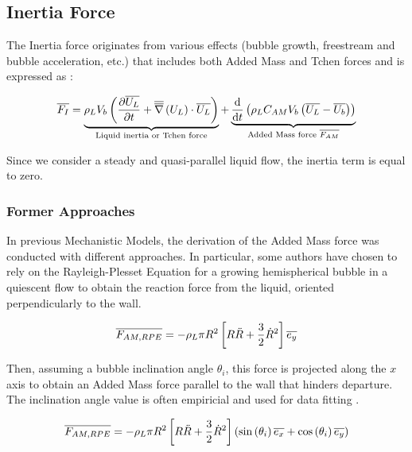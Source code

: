 \subsection{Inertia Force}
\label{subsec:AM}

The Inertia force originates from various effects (bubble growth, freestream and bubble acceleration, etc.) that includes both Added Mass and Tchen forces and is expressed as \cite{magnaudet_motion_2000}:

\begin{equation}
\overline{F_{I}} = \underbrace{ \rho_{L}V_{b}\left( \frac{\partial{\overline{U_{L}}}}{\partial t}+\overline{\overline{\nabla}}\left({U_{L}}\right)\cdot \overline{U_{L}} \right) }_{\text{Liquid inertia or Tchen force}} + \underbrace{ \frac{\mathrm{d}}{\mathrm{d}t}\left( \rho_{L}C_{AM}V_{b}\left( \overline{U_{L}}-\overline{U_{b}} \right) \right) }_{\text{Added Mass force } \overline{F_{AM}}}
\label{eq:F_inertia}
\end{equation}

Since we consider a steady and quasi-parallel liquid flow, the inertia term is equal to zero.



\subsubsection{Former Approaches}
\label{subsubsec:former_AM}

In previous Mechanistic Models, the derivation of the Added Mass force was conducted with different approaches. In particular, some authors have chosen to rely on the Rayleigh-Plesset Equation for a growing hemispherical bubble in a quiescent flow to obtain the reaction force from the liquid, oriented perpendicularly to the wall.

\begin{equation}
\overline{F_{AM,RPE}}=- \rho_{L}\pi R^{2}\left[ R\ddot{R}+\frac{3}{2}\dot{R}^{2} \right]\overline{e_{y}}
\end{equation}

Then, assuming a bubble inclination angle $\theta_{i}$, this force is projected along the $x$ axis to obtain an Added Mass force parallel to the wall that hinders departure. The inclination angle value is often empiricial and used for data fitting \cite{zeng_unified_1993-1, colombo_prediction_2015, mazzocco_reassessed_2018, ren_development_2020}.

\begin{equation}
\overline{F_{AM,RPE}}=- \rho_{L}\pi R^{2}\left[ R\ddot{R}+\frac{3}{2}\dot{R}^{2} \right]\left( \mathrm{sin}\left( \theta_{i} \right)\overline{e_{x}} + \mathrm{cos}\left( \theta_{i} \right)\overline{e_{y}} \right)
\label{eq:AM_RPE}
\end{equation}


